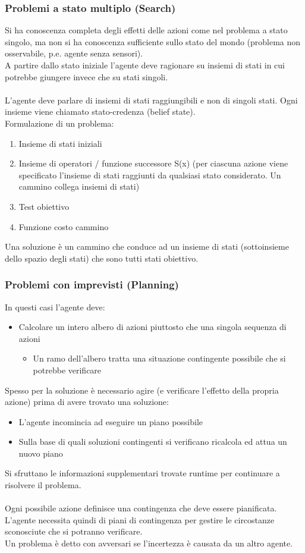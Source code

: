 \documentclass[../main.tex]{subfiles}
\begin{document}
	\subsubsection{Problemi a stato multiplo (Search)}
	Si ha conoscenza completa degli effetti delle azioni come nel problema a stato singolo, ma non si ha conoscenza sufficiente sullo stato del mondo (problema non osservabile, p.e. agente senza sensori).\\
	A partire dallo stato iniziale l’agente deve ragionare su insiemi di stati in cui potrebbe giungere invece che su stati singoli.\\ \\
	L’agente deve parlare di insiemi di stati raggiungibili e non di singoli stati. Ogni insieme viene chiamato stato-credenza (belief state).\\
	Formulazione di un problema:
	\begin{enumerate}
		\item Insieme di stati iniziali
		\item Insieme di operatori / funzione successore S(x) (per ciascuna azione viene specificato l’insieme di stati raggiunti da qualsiasi stato considerato. Un cammino collega insiemi di stati)
		\item Test obiettivo
		\item Funzione costo cammino
	\end{enumerate}
	Una soluzione è un cammino che conduce ad un insieme di stati (sottoinsieme dello spazio degli stati) che sono tutti stati obiettivo.
	\subsubsection{Problemi con imprevisti (Planning)} 
	In questi casi l’agente deve:
	\begin{itemize}
		\item Calcolare un intero albero di azioni piuttosto che una singola sequenza di azioni
		\begin{itemize}
			\item Un ramo dell’albero tratta una situazione contingente possibile che si potrebbe verificare
		\end{itemize}
	\end{itemize}
	Spesso per la soluzione è necessario agire (e verificare l’effetto della propria azione) prima di avere trovato una soluzione:
	\begin{itemize}
		\item L’agente incomincia ad eseguire un piano possibile
		\item Sulla base di quali soluzioni contingenti si verificano ricalcola ed attua un nuovo piano
	\end{itemize}
	Si sfruttano le informazioni supplementari trovate runtime per continuare a risolvere il problema.\\ \\
	Ogni possibile azione definisce una contingenza che deve essere pianificata. \\
	L’agente necessita quindi di piani di contingenza per gestire le circostanze sconosciute che si potranno verificare. \\
	Un problema è detto con avversari se l’incertezza è causata da un altro agente.
\end{document}
